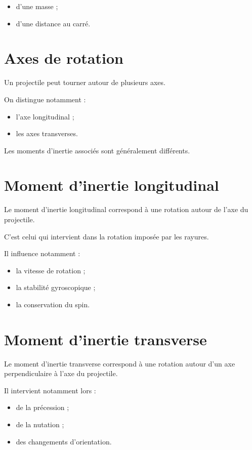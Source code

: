 \begin{itemize}
    \item d'une masse ;
    \item d'une distance au carré.
\end{itemize}

\section{Axes de rotation}

Un projectile peut tourner autour de plusieurs axes.

On distingue notamment :

\begin{itemize}
    \item l'axe longitudinal ;
    \item les axes transverses.
\end{itemize}

Les moments d'inertie associés sont généralement différents.

\section{Moment d'inertie longitudinal}

Le moment d'inertie longitudinal correspond à une rotation autour de l'axe du
projectile.

C'est celui qui intervient dans la rotation imposée par les rayures.

Il influence notamment :

\begin{itemize}
    \item la vitesse de rotation ;
    \item la stabilité gyroscopique ;
    \item la conservation du spin.
\end{itemize}

\section{Moment d'inertie transverse}

Le moment d'inertie transverse correspond à une rotation autour d'un axe
perpendiculaire à l'axe du projectile.

Il intervient notamment lors :

\begin{itemize}
    \item de la précession ;
    \item de la nutation ;
    \item des changements d'orientation.
\end{itemize}

